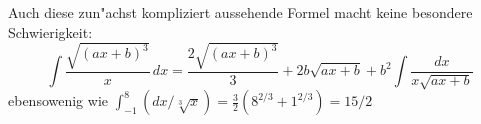 \documentclass{article}
\begin{document}
Auch diese zun"achst kompliziert aussehende Formel macht keine besondere
Schwierigkeit:
\[ \int\frac{\sqrt{(ax+b)^3}}{x}\,dx = \frac{2\sqrt{(ax+b)^3}}{3}
  + 2b\sqrt{ax+b} + b^2\int\frac{dx}{x\sqrt{ax+b}} \]
ebensowenig wie $\int^8_{-1}(dx/\sqrt[3]{x}) = \frac{3}{2}(8^{2/3} +
1^{2/3}) = 15/2$
\end{document}
